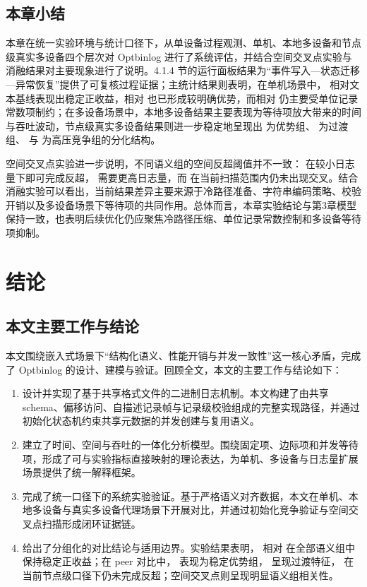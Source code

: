 \subsection{本章小结}\label{ux672cux7ae0ux5c0fux7ed3-2}

本章在统一实验环境与统计口径下，从单设备过程观测、单机、本地多设备和节点级真实多设备四个层次对 Optbinlog 进行了系统评估，并结合空间交叉点实验与消融结果对主要现象进行了说明。4.1.4 节的运行面板结果为``事件写入---状态迁移---异常恢复''提供了可复核过程证据；主统计结果则表明，在单机场景中， 相对文本基线表现出稳定正收益，相对  也已形成较明确优势，而相对  仍主要受单位记录常数项制约；在多设备场景中，本地多设备结果主要表现为等待项放大带来的时间与吞吐波动，节点级真实多设备结果则进一步稳定地呈现出  为优势组、 为过渡组、 与  为高压竞争组的分化结构。

空间交叉点实验进一步说明，不同语义组的空间反超阈值并不一致： 在较小日志量下即可完成反超， 需要更高日志量，而  在当前扫描范围内仍未出现交叉。结合消融实验可以看出，当前结果差异主要来源于冷路径准备、字符串编码策略、校验开销以及多设备场景下等待项的共同作用。总体而言，本章实验结论与第3章模型保持一致，也表明后续优化仍应聚焦冷路径压缩、单位记录常数控制和多设备等待项抑制。

\section{结论}\label{ux7ed3ux8bba}

\subsection{本文主要工作与结论}\label{ux672cux6587ux4e3bux8981ux5de5ux4f5cux4e0eux7ed3ux8bba}

本文围绕嵌入式场景下``结构化语义、性能开销与并发一致性''这一核心矛盾，完成了 Optbinlog 的设计、建模与验证。回顾全文，本文的主要工作与结论如下：

\begin{enumerate}
\def\labelenumi{\arabic{enumi}.}
\tightlist
\item
  设计并实现了基于共享格式文件的二进制日志机制。本文构建了由共享 schema、偏移访问、自描述记录帧与记录级校验组成的完整实现路径，并通过初始化状态机约束共享元数据的并发创建与复用语义。
\item
  建立了时间、空间与吞吐的一体化分析模型。围绕固定项、边际项和并发等待项，形成了可与实验指标直接映射的理论表达，为单机、多设备与日志量扩展场景提供了统一解释框架。
\item
  完成了统一口径下的系统实验验证。基于严格语义对齐数据，本文在单机、本地多设备与真实多设备代理场景下开展对比，并通过初始化竞争验证与空间交叉点扫描形成闭环证据链。
\item
  给出了分组化的对比结论与适用边界。实验结果表明， 相对  在全部语义组中保持稳定正收益；在 peer 对比中， 表现为稳定优势组， 呈现过渡特征， 在当前节点级口径下仍未完成反超；空间交叉点则呈现明显语义组相关性。
\end{enumerate}


